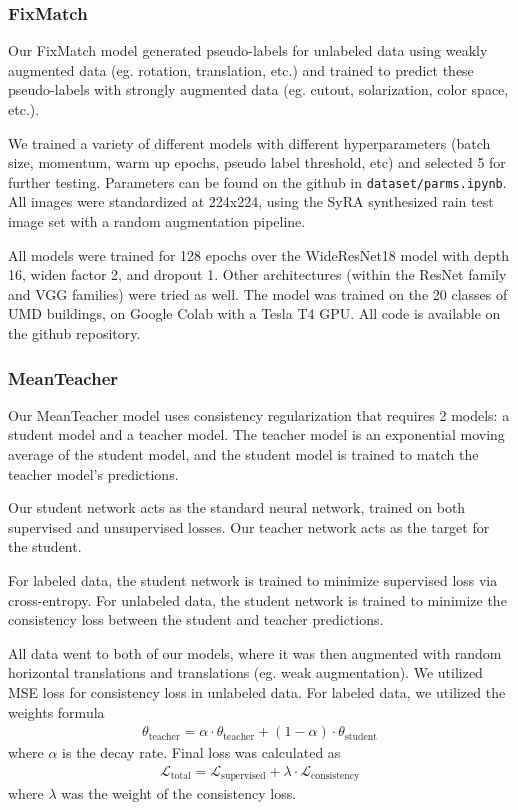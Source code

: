 \documentclass{article}
\begin{document}
\subsubsection{FixMatch}

Our FixMatch model generated pseudo-labels for unlabeled data using weakly augmented data (eg. rotation, translation, etc.) and trained to predict these pseudo-labels with strongly augmented data (eg. cutout, solarization, color space, etc.).

We trained a variety of different models with different hyperparameters (batch size, momentum, warm up epochs, pseudo label threshold, etc) and selected 5 for further testing. Parameters can be found on the github in \verb*|dataset/parms.ipynb|. All images were standardized at 224x224, using the SyRA synthesized rain test image set with a random augmentation pipeline. 

All models were trained for 128 epochs over the WideResNet18 model with depth 16, widen factor 2, and dropout 1. Other architectures (within the ResNet family and VGG families) were tried as well. The model was trained on the 20 classes of UMD buildings, on Google Colab with a Tesla T4 GPU. All code is available on the github repository.

\subsubsection{MeanTeacher}

Our MeanTeacher model uses consistency regularization that requires 2 models: a student model and a teacher model. The teacher model is an exponential moving average of the student model, and the student model is trained to match the teacher model’s predictions.

Our student network acts as the standard neural network, trained on both supervised and unsupervised losses. Our teacher network acts as the target for the student. 

For labeled data, the student network is trained to minimize supervised loss via cross-entropy. For unlabeled data, the student network is trained to minimize the consistency loss between the student and teacher predictions.

All data went to both of our models, where it was then augmented with random horizontal translations and translations (eg. weak augmentation). We utilized MSE loss for consistency loss in unlabeled data. For labeled data, we utilized the weights formula \begin{align*}
    \theta_{\text{teacher}}=\alpha \cdot\theta_{\text{teacher}}+(1-\alpha)\cdot\theta_{\text{student}}
\end{align*} where $\alpha$ is the decay rate. Final loss was calculated as \begin{align*}
    \mathcal{L}_{\text{total}}=\mathcal{L}_{\text{supervised}}+\lambda\cdot\mathcal{L}_{\text{consistency}}
\end{align*}where $\lambda$ was the weight of the consistency loss.
\end{document}
